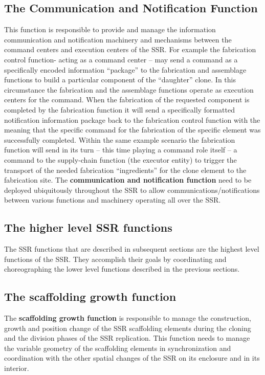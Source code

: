 \documentclass[letterpaper]{article}
\begin{document}
\bigskip

\subsection[The Communication and Notification Function]{The
Communication and Notification Function}
\hypertarget{RefHeading3090306210128}{}This function is responsible to
provide and manage the information communication and notification
machinery and mechanisms between the command centers and execution
centers of the SSR. For example the fabrication control function-
acting as a command center – may send a command as a specifically
encoded information “package”  to the fabrication and assemblage
functions to build a particular component of the “daughter” clone. In
this circumstance the fabrication and the assemblage functions operate
as execution centers for the command. When the fabrication of the
requested component is completed by the fabrication function it will
send a specifically formatted notification information package back to
the fabrication control function with the meaning that the specific
command for the fabrication of the specific element was successfully
completed. Within the same example scenario the fabrication function
will send in its turn – this time playing a command role itself – a
command to the supply-chain function (the executor entity) to trigger
the transport of the needed fabrication “ingredients” for the clone
element to the fabrication site. The \textbf{communication and
notification function} need to be deployed ubiquitously throughout the
SSR to allow communications/notifications between various functions and
machinery operating all over the SSR.


\bigskip

\subsection[The higher level SSR functions]{The higher level SSR
functions}
\hypertarget{RefHeading3092306210128}{}The SSR functions that are
described in subsequent sections are the highest level functions of the
SSR. They accomplish their goals by coordinating and choreographing the
lower level functions described in the previous sections.


\bigskip

\subsection[The scaffolding growth function]{The scaffolding growth
function}
\hypertarget{RefHeading3094306210128}{}The \textbf{scaffolding growth
function} is responsible to manage the construction, growth and
position change of the SSR scaffolding elements during the cloning and
the division phases of the SSR replication. This function needs to
manage the variable geometry of the scaffolding elements in
synchronization and coordination with the other spatial changes of the
SSR on its enclosure and in its interior.
\end{document}
